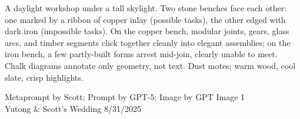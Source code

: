 \documentclass[12pt]{article}
\begin{document}
\noindent
\begin{adjustbox}{max size={\textwidth}{\textheight}}
\begin{varwidth}{\textwidth}
\RaggedRight
\footnotesize
A daylight workshop under a tall skylight. Two stone benches face each other: one marked by a ribbon of copper inlay (possible tasks), the other edged with dark iron (impossible tasks). On the copper bench, modular joints, gears, glass arcs, and timber segments click together cleanly into elegant assemblies; on the iron bench, a few partly-built forms arrest mid-join, clearly unable to meet. Chalk diagrams annotate only geometry, not text. Dust motes; warm wood, cool slate, crisp highlights.
\end{varwidth}
\end{adjustbox}
\vfill
{\raggedleft\footnotesize
Metaprompt by Scott; Prompt by GPT-5; Image by GPT Image 1 \\
Yutong \& Scott's Wedding 8/31/2025\par}
\end{document}
